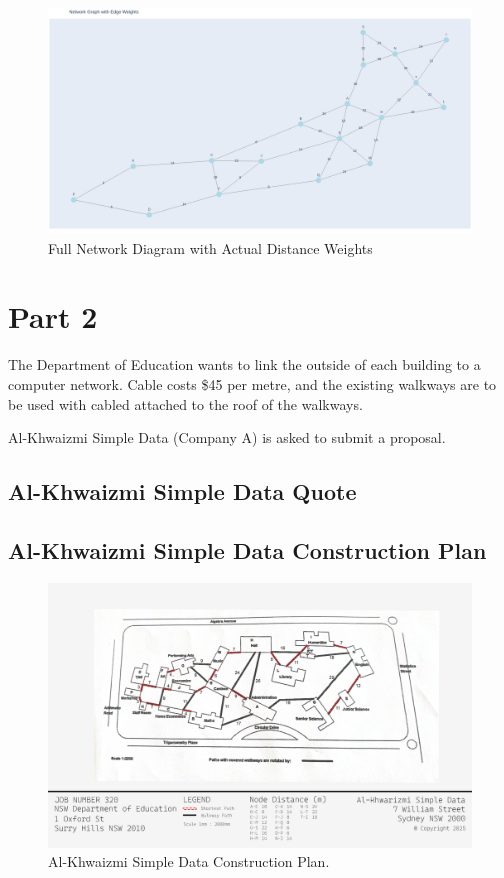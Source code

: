\documentclass[11pt]{book}
\renewcommand{\=}[1]{\stackrel{#1}{=}} %
\theoremstyle{definition}
\theoremstyle{remark}
\begin{document}
\begin{figure}
    \centering
    \includegraphics[width=1\linewidth]{img/FullMapWeights.png}
    \caption{Full Network Diagram with Actual Distance Weights}
    \label{fig:enter-label}
\end{figure}

\chapter{Part 2}
The Department of Education wants to link the outside of each building to a computer network. Cable costs \$45 per metre, and the existing walkways are to be used with cabled attached to the roof of the walkways.

Al-Khwaizmi Simple Data (Company A) is asked to submit a proposal.

\section{Al-Khwaizmi Simple Data Quote}


\section{Al-Khwaizmi Simple Data Construction Plan}
\begin{figure}
    \centering
    \includegraphics[width=1\linewidth]{img/Al-Khwaizmi Simple Data Plan.png}
    \caption{Al-Khwaizmi Simple Data Construction Plan.}
    \label{fig:enter-label}
\end{figure}
\end{document}
